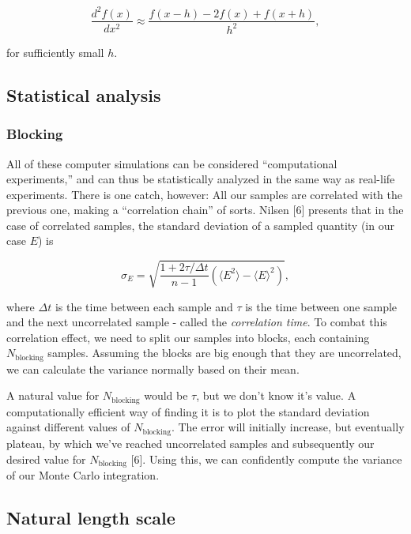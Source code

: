 \documentclass[
]{article}
\begin{document}
\[\frac{d^2 f(x)}{dx^2} \approx \frac{f(x-h) -2f(x) + f(x+h)}{h^2},\]

for sufficiently small \(h\).

\hypertarget{statistical-analysis}{%
\subsection{Statistical analysis}\label{statistical-analysis}}

\hypertarget{blocking}{%
\subsubsection*{Blocking}\label{blocking}}

All of these computer simulations can be considered ``computational
experiments,'' and can thus be statistically analyzed in the same way as
real-life experiments. There is one catch, however: All our samples are
correlated with the previous one, making a ``correlation chain'' of
sorts. Nilsen {[}6{]} presents that in the case of correlated samples,
the standard deviation of a sampled quantity (in our case \(E\)) is

\[ \sigma_E = \sqrt{\frac{1 + 2\tau /\Delta t}{n - 1}\left(\langle E^2\rangle - \langle E\rangle^2\right)}, \]

where \(\Delta t\) is the time between each sample and \(\tau\) is the
time between one sample and the next uncorrelated sample - called the
\emph{correlation time}. To combat this correlation effect, we need to
split our samples into blocks, each containing \(N_\text{blocking}\)
samples. Assuming the blocks are big enough that they are uncorrelated,
we can calculate the variance normally based on their mean.

A natural value for \(N_\text{blocking}\) would be \(\tau\), but we
don't know it's value. A computationally efficient way of finding it is
to plot the standard deviation against different values of
\(N_\text{blocking}\). The error will initially increase, but eventually
plateau, by which we've reached uncorrelated samples and subsequently
our desired value for \(N_\text{blocking}\) {[}6{]}. Using this, we can
confidently compute the variance of our Monte Carlo integration.

\hypertarget{natural-length-scale}{%
\subsection{Natural length scale}\label{natural-length-scale}}
\end{document}
